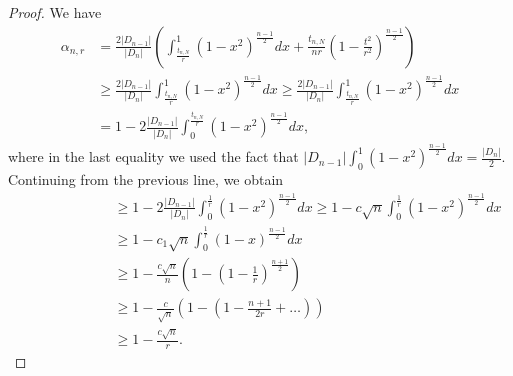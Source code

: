 \documentclass[10pt, twoside, leqno]{article}
\theoremstyle{definition}
\numberwithin{equation}{section}
\begin{document}
\begin{proof} 
We have
\begin{align*}\alpha_{n,r} & =\frac{2|D_{n-1}|}{|D_{n}|}\left(\int_{\frac{t_{n,N}}{r}}^{1}\left(1-x^{2}\right)^{\frac{n-1}{2}}dx+\frac{t_{n,N}}{nr}\left(1-\frac{t^{2}}{r^{2}}\right)^{\frac{n-1}{2}}\right)\\
& \geq\frac{2|D_{n-1}|}{|D_{n}|}\int_{\frac{t_{n,N}}{r}}^{1}\left(1-x^{2}\right)^{\frac{n-1}{2}}dx \geq\frac{2|D_{n-1}|}{|D_{n}|}\int_{\frac{t_{n,N}}{r}}^{1}\left(1-x^{2}\right)^{\frac{n-1}{2}}dx\\
& =1-2\frac{|D_{n-1}|}{|D_{n}|}\int_{0}^{\frac{t_{n,N}}{r}}\left(1-x^{2}\right)^{\frac{n-1}{2}}dx,
\end{align*}
where in the last equality we used the fact that  $ |D_{n-1}|\int_{0}^{1}\left(1-x^{2}\right)^{\frac{n-1}{2}}dx= \frac{|D_n|}{2}$. Continuing from the previous line, we obtain
\begin{align*}\quad\quad\quad\quad\quad\quad & \geq1-2\frac{|D_{n-1}|}{|D_{n}|}\int_{0}^{\frac{1}{r}}\left(1-x^{2}\right)^{\frac{n-1}{2}}dx\geq1-c\sqrt{n}\int_{0}^{\frac{1}{r}}\left(1-x^{2}\right)^{\frac{n-1}{2}}dx\\
& \geq1-c_{1}\sqrt{n}\int_{0}^{\frac{1}{r}}\left(1-x\right)^{\frac{n-1}{2}}dx\\
& \geq1-\frac{c\sqrt{n}}{n}\left(1-\left(1-\frac{1}{r}\right)^{\frac{n+1}{2}}\right)\\
& \geq1-\frac{c}{\sqrt{n}}\left(1-\left(1-\frac{n+1}{2r}+\ldots\right)\right)\\
& \geq1-\frac{c\sqrt{n}}{r}.
\end{align*}
\end{proof}

\end{document}
